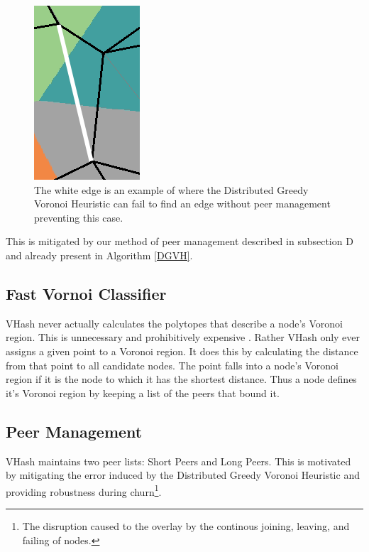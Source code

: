 \documentclass{IEEEtran}
\begin{document}
\begin{figure}
	\centering
	\includegraphics[width=0.5\linewidth]{blocking-example2}
	\caption{The white edge is an example of where the Distributed Greedy Voronoi Heuristic can fail to find an edge without peer management preventing this case.}
	\label{occ-ex}
\end{figure}


This is mitigated by our method of peer management described in subsection D and already present in Algorithm \ref{DGVH}.


\subsection{Fast Vornoi Classifier}
VHash never actually calculates the polytopes that describe a node's Voronoi region.
This is unnecessary and prohibitively expensive \cite{raynet}.
Rather VHash only ever assigns a given point to a Voronoi region.
It does this by calculating the distance from that point to all candidate nodes.
The point falls into a node's Voronoi region if it is the node to which it has the shortest distance.
Thus a node defines it's Voronoi region by keeping a list of the peers that bound it.

\subsection{Peer Management}
VHash maintains two peer lists: Short Peers and Long Peers.
This is motivated by mitigating the error induced by the Distributed Greedy Voronoi Heuristic and providing robustness during churn\footnote{The disruption caused to the overlay by the continous joining, leaving, and failing of nodes.}.
\end{document}
